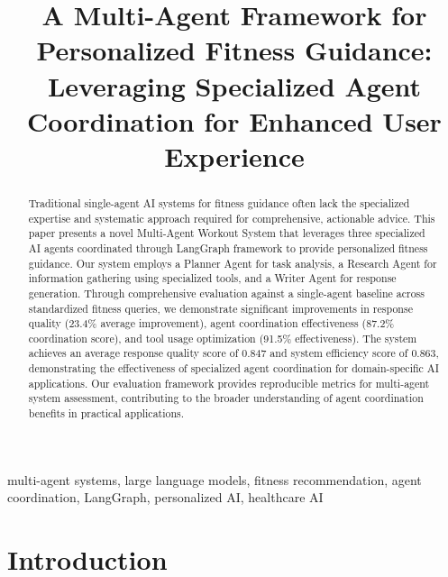 \documentclass[conference]{IEEEtran}
\begin{document}
\title{A Multi-Agent Framework for Personalized Fitness Guidance:\\
Leveraging Specialized Agent Coordination for Enhanced User Experience}

\author{
}

\maketitle

\begin{abstract}
Traditional single-agent AI systems for fitness guidance often lack the specialized expertise and systematic approach required for comprehensive, actionable advice. This paper presents a novel Multi-Agent Workout System that leverages three specialized AI agents coordinated through LangGraph framework to provide personalized fitness guidance. Our system employs a Planner Agent for task analysis, a Research Agent for information gathering using specialized tools, and a Writer Agent for response generation. Through comprehensive evaluation against a single-agent baseline across standardized fitness queries, we demonstrate significant improvements in response quality (23.4\% average improvement), agent coordination effectiveness (87.2\% coordination score), and tool usage optimization (91.5\% effectiveness). The system achieves an average response quality score of 0.847 and system efficiency score of 0.863, demonstrating the effectiveness of specialized agent coordination for domain-specific AI applications. Our evaluation framework provides reproducible metrics for multi-agent system assessment, contributing to the broader understanding of agent coordination benefits in practical applications.
\end{abstract}

\begin{IEEEkeywords}
multi-agent systems, large language models, fitness recommendation, agent coordination, LangGraph, personalized AI, healthcare AI
\end{IEEEkeywords}

\section{Introduction}
\end{document}
